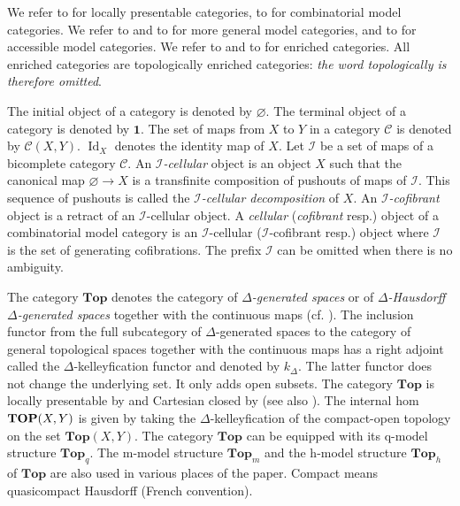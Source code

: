 \documentclass[a4paper,12pt]{amsart}
\newcommand{\C}{\mathcal{C}}
\theoremstyle{definition}
\renewcommand{\top}{{\mathbf{Top}}}
\newcommand{\brm}[1]{{\rm{\mathbf{#1}}}}
\newcommand{\ttop}{{\brm{TOP}}}
\DeclareMathOperator{\id}{Id}
\begin{document}
We refer to \cite{TheBook} for locally presentable categories, to \cite{MR2506258} for combinatorial model categories.  We refer to \cite{MR99h:55031} and to \cite{ref_model2} for more general model categories, and to \cite{zbMATH06722019,HKRS17,GKR18} for accessible model categories. We refer to \cite{KellyEnriched} and to \cite[Chapter~6]{Borceux2} for enriched categories. All enriched categories are topologically enriched categories: \textit{the word topologically is therefore omitted}. 

The initial object of a category is denoted by $\varnothing$. The terminal object of a category is denoted by $\mathbf{1}$. The set of maps from $X$ to $Y$ in a category $\C$ is denoted by $\C(X,Y)$. $\id_X$ denotes the identity map of $X$. Let $\mathcal{I}$ be a set of maps of a bicomplete category $\C$. An \textit{$\mathcal{I}$-cellular} object is an object $X$ such that the canonical map $\varnothing \to X$ is a transfinite composition of pushouts of maps of $\mathcal{I}$. This sequence of pushouts is called the \textit{$\mathcal{I}$-cellular decomposition} of $X$. An \textit{$\mathcal{I}$-cofibrant} object is a retract of an $\mathcal{I}$-cellular object. A \textit{cellular} (\textit{cofibrant} resp.) object of a combinatorial model category is an $\mathcal{I}$-cellular ($\mathcal{I}$-cofibrant resp.) object where $\mathcal{I}$ is the set of generating cofibrations. The prefix $\mathcal{I}$ can be omitted when there is no ambiguity. 

The category $\top$ denotes the category of \textit{$\Delta$-generated spaces} or of \textit{$\Delta$-Hausdorff $\Delta$-generated spaces} together with the continuous maps (cf. \cite[Section~2 and Appendix~B]{leftproperflow}). The inclusion functor from the full subcategory of $\Delta$-generated spaces to the category of general topological spaces together with the continuous maps has a right adjoint called the $\Delta$-kelleyfication functor and denoted by $k_\Delta$. The latter functor does not change the underlying set. It only adds open subsets. The category $\top$ is locally presentable by \cite[Theorem~3.9]{FR} and Cartesian closed by \cite[Theorem~3.6]{MR45:9323} (see also \cite[Proposition~2.5]{mdtop}). The internal hom $\ttop(X,Y)$ is given by taking the $\Delta$-kelleyfication of the compact-open topology on the set $\top(X,Y)$. The category $\top$ can be equipped with its q-model structure $\top_q$. The m-model structure $\top_m$ \cite{mixed-cole} and the h-model structure $\top_h$ \cite{Barthel-Riel} of $\top$ are also used in various places of the paper. Compact means quasicompact Hausdorff (French convention). 
\end{document}
